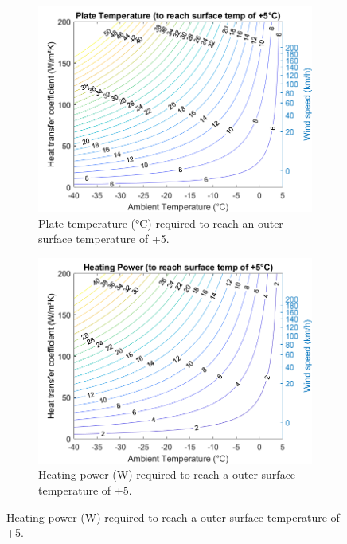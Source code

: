\begin{figure}[ht]
\centering
\begin{minipage}[b]{0.48\linewidth}
\begin{figure} [H]
	\centering
	\includegraphics[scale=0.45]{Pictures/Plate_Tsurf5_PlateTemp.png}
	\caption[Heating Plate - Plate Temperature Graph]{Plate temperature (°C) required to reach an outer surface temperature of +5\dC.}
	\label{fig:PlateTemp}
\end{figure}

\label{fig:minipage1}
\end{minipage}
\quad
\begin{minipage}[b]{0.48\linewidth}
\begin{figure} [H]
	\centering
	\includegraphics[scale=0.45]{Pictures/Plate_Tsurf5_Power.png}
	\caption[Heating Plate - Heating Power Graph]{Heating power (W) required to reach a outer surface temperature of +5\dC.}
	\label{fig:PlatePower}
\end{figure}
\label{fig:minipage2}
\end{minipage}
\end{figure}




